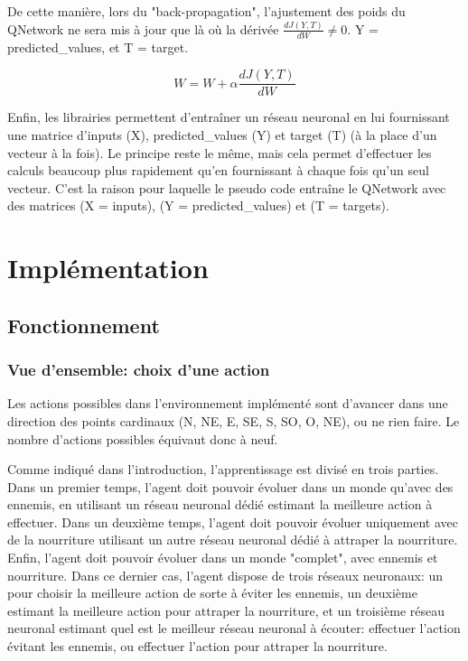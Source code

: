 \documentclass[11pt,a4paper]{report}
\begin{document}
  \par De cette manière, lors du "back-propagation", l'ajustement des poids du QNetwork ne sera mis à jour que là où la dérivée $\frac{dJ(Y,T)}{dW} \neq 0$. Y = predicted\_values, et T = target.
  
  $$W = W + \alpha \frac{dJ(Y,T)}{dW}$$
  
  \par Enfin, les librairies permettent d’entraîner un réseau neuronal en lui fournissant une matrice d'inputs (X), predicted\_values (Y) et target (T) (à la place d'un vecteur à la fois). Le principe reste le même, mais cela permet d'effectuer les calculs beaucoup plus rapidement qu'en fournissant à chaque fois qu'un seul vecteur. C'est la raison pour laquelle le pseudo code entraîne le QNetwork avec des matrices (X = inputs), (Y = predicted\_values) et (T = targets). 
  
  \chapter{Implémentation}
  
  \section{Fonctionnement}
  
  \subsection{Vue d'ensemble: choix d'une action}
  
  \par Les actions possibles dans l'environnement implémenté sont d'avancer dans une direction des points cardinaux (N, NE, E, SE, S, SO, O, NE), ou ne rien faire. Le nombre d'actions possibles équivaut donc à neuf. 

  \par Comme indiqué dans l'introduction, l'apprentissage est divisé en trois parties. Dans un premier temps, l'agent doit pouvoir évoluer dans un monde qu'avec des ennemis, en utilisant un réseau neuronal dédié estimant la meilleure action à effectuer. Dans un deuxième temps, l'agent doit pouvoir évoluer uniquement avec de la nourriture utilisant un autre réseau neuronal dédié à attraper la nourriture. Enfin, l'agent doit pouvoir évoluer dans un monde "complet", avec ennemis et nourriture. Dans ce dernier cas, l'agent dispose de trois réseaux neuronaux: un pour choisir la meilleure action de sorte à éviter les ennemis, un deuxième estimant la meilleure action pour attraper la nourriture, et un troisième réseau neuronal estimant quel est le meilleur réseau neuronal à écouter: effectuer l'action évitant les ennemis, ou effectuer l'action pour attraper la nourriture. 
  
\end{document}
